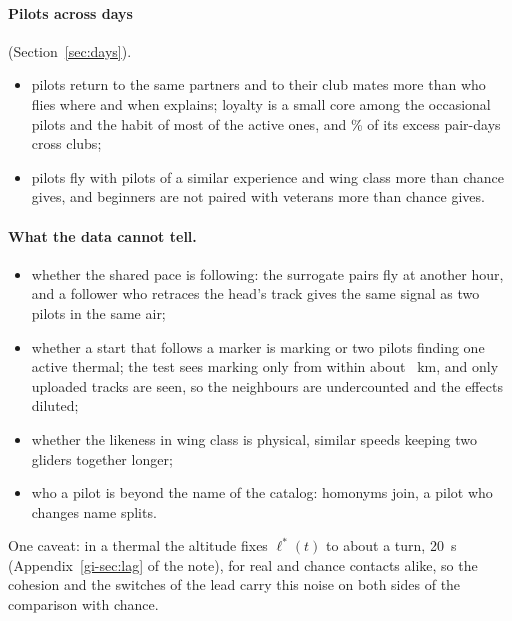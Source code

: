 \paragraph{Pilots across days} (Section~\ref{sec:days}).
\begin{itemize}
  \item pilots return to the same partners and to their club mates more than who flies where and
        when explains; loyalty is a small core among the occasional pilots and the habit of most
        of the active ones, and \StNwShareDiff\% of its excess pair-days cross clubs;
  \item pilots fly with pilots of a similar experience and wing class more than chance gives, and
        beginners are not paired with veterans more than chance gives.
\end{itemize}

\paragraph{What the data cannot tell.}
\begin{itemize}
  \item whether the shared pace is following: the surrogate pairs fly at another hour, and a
        follower who retraces the head's track gives the same signal as two pilots in the same air;
  \item whether a start that follows a marker is marking or two pilots finding one active thermal;
        the test sees marking only from within about \StMkReach~km, and only uploaded tracks are
        seen, so the neighbours are undercounted and the effects diluted;
  \item whether the likeness in wing class is physical, similar speeds keeping two gliders
        together longer;
  \item who a pilot is beyond the name of the catalog: homonyms join, a pilot who changes name
        splits.
\end{itemize}

\medskip
One caveat: in a thermal the altitude fixes $\ell^*(t)$ to about a turn, 20~s
(Appendix~\ref{gi-sec:lag} of the note), for real and chance contacts alike, so the cohesion and the switches of
the lead carry this noise on both sides of the comparison with chance.
